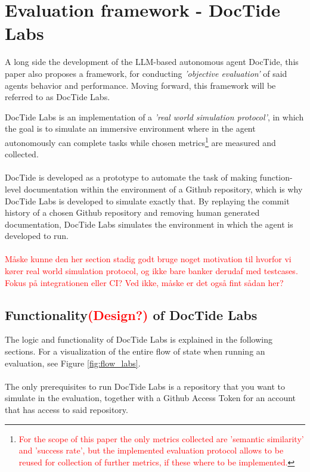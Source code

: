 \section{Evaluation framework - DocTide Labs}
\label{sec:DocTideLabs}
A long side the development of the LLM-based autonomous agent DocTide, this paper also proposes a framework, for conducting \textit{'objective evaluation'} of said agents behavior and performance. Moving forward, this framework will be referred to as DocTide Labs.

DocTide Labs is an implementation of a \textit{'real world simulation protocol'}, in which the goal is to simulate an immersive environment where in the agent autonomously can complete tasks while chosen metrics\footnote{\textcolor{red}{For the scope of this paper the only metrics collected are 'semantic similarity' and 'success rate', but the implemented evaluation protocol allows to be reused for collection of further metrics, if these where to be implemented.}} are measured and collected\cite{wang2024survey}.
\\ \\
DocTide is developed as a prototype to automate the task of making function-level documentation within the environment of a Github repository, which is why DocTide Labs is developed to simulate exactly that. By replaying the commit history of a chosen Github repository and removing human generated documentation, DocTide Labs simulates the environment in which the agent is developed to run.
\\ \\
\textcolor{red}{Måske kunne den her section stadig godt bruge noget motivation til hvorfor vi kører real world simulation protocol, og ikke bare banker derudaf med testcases. Fokus på integrationen eller CI? Ved ikke, måske er det også fint sådan her?}

\subsection{Functionality\textcolor{red}{(Design?)} of DocTide Labs}
The logic and functionality of DocTide Labs is explained in the following sections. For a visualization of the entire flow of state when running an evaluation, see Figure \ref{fig:flow_labs}.
\\ \\
The only prerequisites to run DocTide Labs is a repository that you want to simulate in the evaluation, together with a Github Access Token for an account that has access to said repository.

